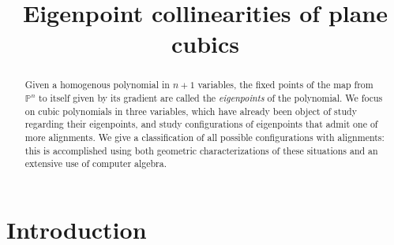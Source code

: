 \documentclass[11pt, a4paper, reqno, captions=tableheading,bibliography=totoc]{scrartcl}
\title{Eigenpoint collinearities of plane cubics}
\author{}
\date{}
\theoremstyle{plain}
\theoremstyle{definition}
\newcommand{\p}{\mathbb{P}}
\begin{document}
\maketitle

\begin{abstract}
 Given a homogenous polynomial in $n+1$ variables, the fixed points of the map from $\p^n$ to itself given by its gradient are called the \emph{eigenpoints} of the polynomial. We focus on cubic polynomials in three variables, which have already been object of study regarding their eigenpoints, and study configurations of eigenpoints that admit one of more alignments. We give a classification of all possible configurations with alignments: this is accomplished using both geometric characterizations of these situations and an extensive use of computer algebra.
\end{abstract}

\section{Introduction}
\end{document}
